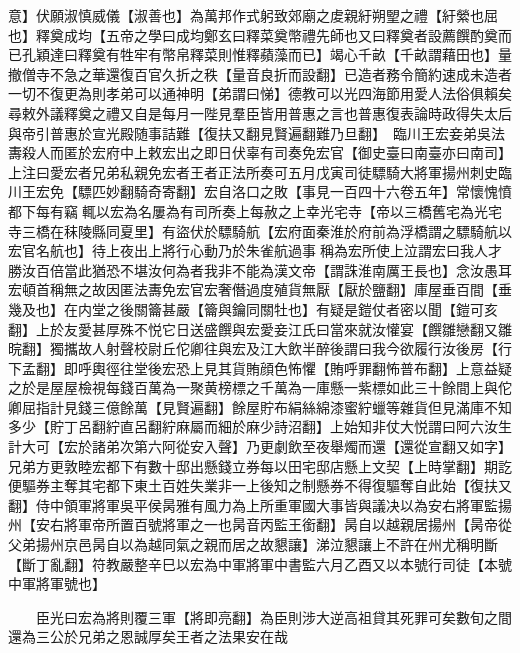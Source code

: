 意】伏願淑慎威儀【淑善也】為萬邦作式躬致郊廟之䖍親紆朔朢之禮【紆縈也屈也】釋奠成均【五帝之學曰成均鄭玄曰釋菜奠幣禮先師也又曰釋奠者設薦饌酌奠而已孔穎達曰釋奠有牲牢有幣帛釋菜則惟釋蘋藻而已】竭心千畝【千畝謂藉田也】量撤僧寺不急之華還復百官久折之秩【量音良折而設翻】已造者務令簡約速成未造者一切不復更為則孝弟可以通神明【弟謂曰悌】德教可以光四海節用愛人法俗俱賴矣尋敕外議釋奠之禮又自是每月一陛見羣臣皆用普惠之言也普惠復表論時政得失太后與帝引普惠於宣光殿随事詰難【復扶又翻見賢遍翻難乃旦翻】　臨川王宏妾弟吳法夀殺人而匿於宏府中上敕宏出之即日伏辜有司奏免宏官【御史臺曰南臺亦曰南司】上注曰愛宏者兄弟私親免宏者王者正法所奏可五月戊寅司徒驃騎大將軍揚州刺史臨川王宏免【驃匹妙翻騎奇寄翻】宏自洛口之敗【事見一百四十六卷五年】常懷愧憤都下每有竊輒以宏為名屢為有司所奏上每赦之上幸光宅寺【帝以三橋舊宅為光宅寺三橋在秣陵縣同夏里】有盜伏於驃騎航【宏府面秦淮於府前為浮橋謂之驃騎航以宏官名航也】待上夜出上將行心動乃於朱雀航過事稱為宏所使上泣謂宏曰我人才勝汝百倍當此猶恐不堪汝何為者我非不能為漢文帝【謂誅淮南厲王長也】念汝愚耳宏頓首稱無之故因匿法夀免宏官宏奢僭過度殖貨無厭【厭於鹽翻】庫屋垂百間【垂幾及也】在内堂之後關籥甚嚴【籥與鑰同關牡也】有疑是鎧仗者密以聞【鎧可亥翻】上於友愛甚厚殊不悦它日送盛饌與宏愛妾江氏曰當來就汝懽宴【饌雛戀翻又雛晥翻】獨攜故人射聲校尉丘佗卿往與宏及江大飲半醉後謂曰我今欲履行汝後房【行下孟翻】即呼輿徑往堂後宏恐上見其貨賄顔色怖懼【賄呼罪翻怖普布翻】上意益疑之於是屋屋檢視每錢百萬為一聚黄榜標之千萬為一庫懸一紫標如此三十餘間上與佗卿屈指計見錢三億餘萬【見賢遍翻】餘屋貯布絹絲綿漆蜜紵蠟等雜貨但見滿庫不知多少【貯丁呂翻紵直呂翻紵麻屬而細於麻少詩沼翻】上始知非仗大悦謂曰阿六汝生計大可【宏於諸弟次第六阿從安入聲】乃更劇飲至夜舉燭而還【還從宣翻又如字】兄弟方更敦睦宏都下有數十邸出懸錢立券每以田宅邸店懸上文契【上時掌翻】期訖便驅券主奪其宅都下東土百姓失業非一上後知之制懸券不得復驅奪自此始【復扶又翻】侍中領軍將軍吳平侯昺雅有風力為上所重軍國大事皆與議决以為安右將軍監揚州【安右將軍帝所置百號將軍之一也昺音丙監王銜翻】昺自以越親居揚州【昺帝從父弟揚州京邑昺自以為越同氣之親而居之故懇讓】涕泣懇讓上不許在州尤稱明斷【斷丁亂翻】符教嚴整辛巳以宏為中軍將軍中書監六月乙酉又以本號行司徒【本號中軍將軍號也】

　　臣光曰宏為將則覆三軍【將即亮翻】為臣則涉大逆高祖貸其死罪可矣數旬之間還為三公於兄弟之恩誠厚矣王者之法果安在哉

